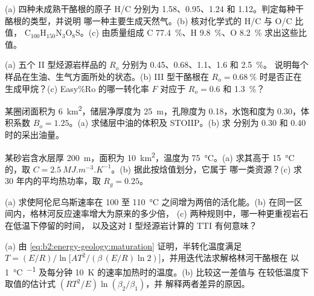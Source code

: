 \begin{exercise}[$\star$]\label{exo:b2:energy-geology:1}
(a) 四种未成熟干酪根的原子 H/C 分别为 1.58、0.95、1.24 和 1.12。判定每种干酪根的类型，并说明
哪一种主要生成天然气。(b) 核对化学式的 H/C 与 O/C 比值，
C$_{100}$H$_{150}$N$_3$O$_8$S。(c) 由质量组成 C \qty{77.4}{\percent}、H
\qty{9.8}{\percent}、O \qty{8.2}{\percent} 求出这些比值。
\end{exercise}

\begin{exercise}[$\star$]\label{exo:b2:energy-geology:2}
(a) 五个 II 型烃源岩样品的 $R_o$ 分别为 0.45、0.68、1.1、1.6 和 \qty{2.5}{\percent}。
说明每个样品在生油、生气方面所处的状态。(b) III 型干酪根在 $R_o =
\qty{0.68}{\percent}$ 时是否正在生成甲烷？(c) Easy\%Ro 的哪一转化率 $F$ 对应于
$R_o = 0.6$ 和 \qty{1.3}{\percent}？
\end{exercise}

\begin{exercise}[$\star$]\label{exo:b2:energy-geology:3}
某圈闭面积为 \qty{6}{km^2}，储层净厚度为 \qty{25}{m}，孔隙度为 0.18，水饱和度为
0.30，体积系数 $B_o = 1.25$。(a) 求储层中油的体积及 STOIIP。(b) 求
分别为 0.30 和 0.40 时的采出油量。
\end{exercise}

\begin{exercise}[$\star$]\label{exo:b2:energy-geology:4}
某砂岩含水层厚 \qty{200}{m}，面积为 \qty{10}{km^2}，温度为 \qty{75}{\celsius}。(a) 求其高于
\qty{15}{\celsius} 的，取 $C = \qty{2.5}{MJ.m^{-3}.K^{-1}}$。(b) 据此按焓值划分，它属于
哪一类资源？(c) 求 30 年内的平均热功率，取 $R_g = 0.25$。
\end{exercise}

\begin{exercise}[$\star\star$]\label{exo:b2:energy-geology:5}
(a) 求使阿伦尼乌斯速率在 100 至
\qty{110}{\celsius} 之间增为两倍的活化能。(b) 在同一区间内，格林河反应速率增大为原来的多少倍，
(c) 两种规则中，哪一种更重视岩石在低温下停留的时间，
以及这对 I 型烃源岩计算的 TTI 有何意味？
\end{exercise}

\begin{exercise}[$\star\star$]\label{exo:b2:energy-geology:6}
(a) 由 \eqref{eq:b2:energy-geology:maturation} 证明，半转化温度满足
$T = (E/R)\big/\ln\bigl[A T^2/(\beta\,(E/R)\ln 2)\bigr]$，并用迭代法求解格林河干酪根在
以 \qty{1}{\celsius\per\Ma} 及每分钟 \qty{10}{K} 的速率加热时的温度。(b) 比较这一差值与
在较低温度下取值的估计式 $(RT^2/E)\ln(\beta_2/\beta_1)$，并
解释两者差异的原因。
\end{exercise}

